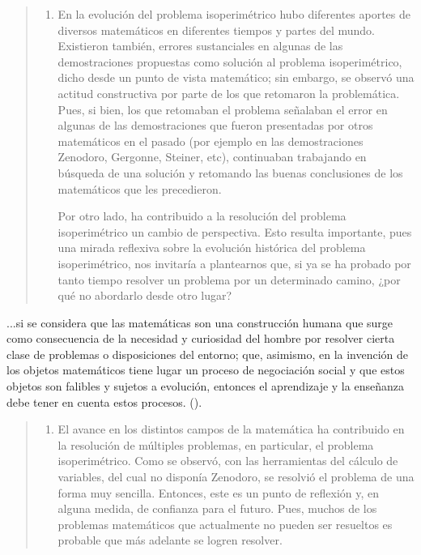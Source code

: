 \begin{quote}
	\begin{enumerate}[series=isoper]
		\item En la evolución del problema isoperimétrico hubo diferentes aportes de diversos matemáticos en diferentes tiempos y partes del mundo. Existieron también, errores sustanciales en algunas de las demostraciones propuestas como solución al problema isoperimétrico, dicho desde un punto de vista matemático; sin embargo, se observó una actitud constructiva por parte de los que retomaron la problemática. Pues, si bien, los que retomaban el problema señalaban el error en algunas de las demostraciones que fueron presentadas por otros matemáticos en el pasado (por ejemplo en las demostraciones Zenodoro, Gergonne, Steiner, etc), continuaban trabajando en búsqueda de una solución y retomando las buenas conclusiones de los matemáticos que les precedieron.
		
		Por otro lado, ha contribuido a la resolución del problema isoperimétrico un cambio de perspectiva. Esto resulta importante, pues una mirada reflexiva sobre la evolución histórica del problema isoperimétrico, nos invitaría a plantearnos que, si ya se ha probado por tanto tiempo resolver un problema por un determinado camino, ¿por qué no abordarlo desde otro lugar?
	\end{enumerate}
\end{quote}
\vspace{1em}

...si se considera que las matemáticas son una construcción humana que surge como consecuencia de la necesidad y curiosidad del hombre por resolver cierta clase de problemas o disposiciones del entorno; que, asimismo, en la invención de los objetos matemáticos tiene lugar un proceso de negociación social y que estos objetos son falibles y sujetos a evolución, entonces el aprendizaje y la enseñanza debe tener en cuenta estos procesos. (\textcite{godino2003}).

\vspace{1em}
\begin{quote}
	\begin{enumerate}[resume=isoper]
		\item El avance en los distintos campos de la matemática ha contribuido en la resolución de múltiples problemas, en particular, el problema isoperimétrico. Como se observó, con las herramientas del cálculo de variables, del cual no disponía Zenodoro, se resolvió el problema de una forma muy sencilla. Entonces, este es un punto de reflexión y, en alguna medida, de confianza para el futuro. Pues, muchos de los problemas matemáticos que actualmente no pueden ser resueltos es probable que más adelante se logren resolver.
	\end{enumerate}
\end{quote}
\vspace{1em}

